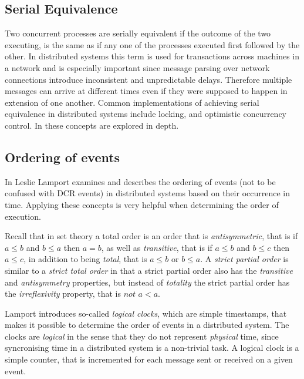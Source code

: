 		\subsection{Serial Equivalence}
		Two concurrent processes are serially equivalent if the outcome of the two executing, is the same as if any one of the processes executed first followed by the other. In distributed systems this term is used for transactions across machines in a network and is especially important since message parsing over network connections introduce inconsistent and unpredictable delays. Therefore multiple messages can arrive at different times even if they were supposed to happen in extension of one another. Common implementations of achieving serial equivalence in distributed systems include locking, and optimistic concurrency control. In \cite{Coulouris:2011:DSC:2029110} these concepts are explored in depth.
		
		\subsection{Ordering of events}\label{subsec:orderingofevents}
		In \cite{Lamport:1978:TCO:359545.359563} Leslie Lamport examines and describes the ordering of events (not to be confused with DCR events) in distributed systems based on their occurrence in time. Applying these concepts is very helpful when determining the order of execution. 
		

		\newpar {}Recall that in set theory a total order is an order that is \textit{antisymmetric}, that is if $a \leq b$ and $b \leq a$ then $a = b$, as well as \textit{transitive}, that is if $a \leq b$ and $b \leq c$ then $a \leq c$, in addition to being \textit{total}, that is $a \leq b$ or $b \leq a$. A \textit{strict partial order} is similar to a \textit{strict total order} in that a strict partial order also has the \textit{transitive} and \textit{antisymmetry} properties, but instead of \textit{totality} the strict partial order has the \textit{irreflexivity} property, that is $not$ $a < a$. 
		
		\newpar Lamport introduces so-called \textit{logical clocks}, which are simple timestamps, that makes it possible to determine the order of events in a distributed system. The clocks are \textit{logical} in the sense that they do not represent \textit{physical} time, since syncronising time in a distributed system is a non-trivial task. A logical clock is a simple counter, that is incremented for each message sent or received on a given event. 
		
